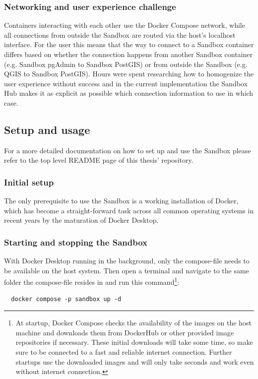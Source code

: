 \documentclass[11pt, a4paper, oneside, parskip=full-]{scrartcl}
\begin{document}
\subsubsection*{Networking and user experience challenge}
Containers interacting with each other use the Docker Compose network, while all
connections from outside the Sandbox are routed via the host's localhost
interface. For the user this means that the way to connect to a Sandbox
container differs based on whether the connection happens from another Sandbox
container (e.g. Sandbox pgAdmin to Sandbox PostGIS) or from outside the Sandbox
(e.g. QGIS to Sandbox PostGIS). Hours were spent researching how to homogenize
the user experience without success and in the current implementation the
Sandbox Hub makes it as explicit as possible which connection information to use
in which case.


\subsection{Setup and usage}
For a more detailed documentation on how to set up and use the Sandbox please
refer to the top level README page of this thesis'
repository\cite{osgeostacksandbox}.

\subsubsection*{Initial setup}
The only prerequisite to use the Sandbox is a working installation of Docker,
which has become a straight-forward task across all common operating systems in
recent years by the maturation of Docker Desktop\cite{dockerdesktop}.

\subsubsection*{Starting and stopping the Sandbox}
With Docker Desktop running in the background, only the
compose-file\cite{sandboxcomposefile} needs to be available on the host system.
Then open a terminal and navigate to the same folder the compose-file resides in
and run this command\footnote{At startup, Docker Compose checks the availability
of the images on the host machine and downloads them from DockerHub or other
provided image repositories if necessary. These initial downloads will take some
time, so make sure to be connected to a fast and reliable internet connection.
Further startups use the downloaded images and will only take seconds and work
even without internet connection.}:
\begin{lstlisting}
  docker compose -p sandbox up -d
\end{lstlisting}
\end{document}
